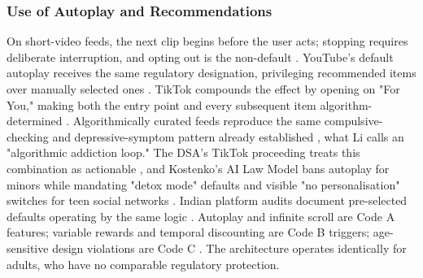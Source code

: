 \documentclass[11pt]{article}
\begin{document}
\subsubsection{Use of Autoplay and Recommendations}
\label{sec:use_autoplay_recommendations} On short-video feeds, the next clip begins before the user acts; stopping requires deliberate interruption, and opting out is the non-default \parencites[2]{8958037}. YouTube's default autoplay receives the same regulatory designation, privileging recommended items over manually selected ones \parencites[42]{3195574}. TikTok compounds the effect by opening on "For You," making both the entry point and every subsequent item algorithm-determined \parencites[42]{3195574}. Algorithmically curated feeds reproduce the same compulsive-checking and depressive-symptom pattern already established \parencites[2]{3303310}, what Li calls an "algorithmic addiction loop." The DSA's TikTok proceeding treats this combination as actionable \parencites[2]{8958037}[42]{3195574}, and Kostenko's AI Law Model bans autoplay for minors while mandating "detox mode" defaults and visible "no personalisation" switches for teen social networks \parencites[221]{2977039}[223]{2977039}. Indian platform audits document pre-selected defaults operating by the same logic \parencites[4]{6295677}[42]{3195574}. Autoplay and infinite scroll are Code A features; variable rewards and temporal discounting are Code B triggers; age-sensitive design violations are Code C \parencites[2]{8958037}[2]{3303310}[221]{2977039}[6]{6295677}[2]{3303310}[12]{2977039}. The architecture operates identically for adults, who have no comparable regulatory protection.
\end{document}
